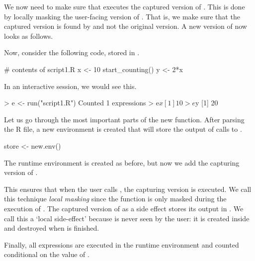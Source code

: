We now need to make sure that  executes the captured version of
.  This is done by locally masking the user-facing
version of . That is, we make sure that the captured
version is found by  and not the original version. A new version of
 now looks as follows.
Now, consider the following code, stored in .
\begin{example}
  # contents of script1.R
  x <- 10
  start_counting()
  y <- 2*x
\end{example}
In an interactive session, we would see this.
\begin{example}
  > e <- run("script1.R")
  Counted 1 expressions
  > e$x
  [1] 10
  > e$y
  [1] 20
\end{example}

Let us go through the most important parts of the new  function.
After parsing the R file,  a new environment is created that will store the
output of calls to .
\begin{example}
    store  <- new.env()
\end{example}
The runtime environment is created as before, but now we add the capturing
version of .
This ensures that when the user calls , the capturing
version is executed. We call this technique \emph{local masking} since the
 function is only masked during the execution of
.  
The captured version of as a side effect stores its
output in .  We call this a `local side-effect' because
 is never seen by the user: it is created inside  and
destroyed when  is finished.

Finally, all expressions are executed in the runtime environment and counted
conditional on the value of
. 

